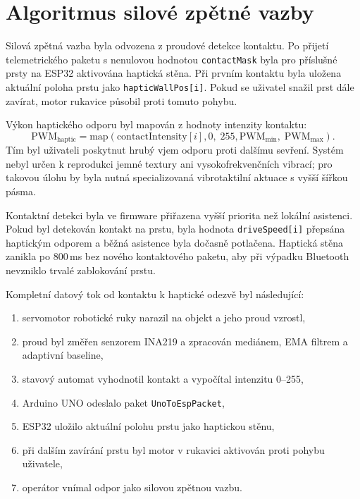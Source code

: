 \section{Algoritmus silové zpětné vazby}
\label{sec:algoritmus-force-feedback}

Silová zpětná vazba byla odvozena z proudové detekce kontaktu. Po přijetí telemetrického paketu s nenulovou hodnotou \texttt{contactMask} byla pro příslušné prsty na ESP32 aktivována haptická stěna. Při prvním kontaktu byla uložena aktuální poloha prstu jako \texttt{hapticWallPos[i]}. Pokud se uživatel snažil prst dále zavírat, motor rukavice působil proti tomuto pohybu.

Výkon haptického odporu byl mapován z hodnoty intenzity kontaktu:
\begin{equation}
    \mathrm{PWM}_{\mathrm{haptic}} =
    \mathrm{map}\left(
        \mathrm{contactIntensity}[i],
        0,\;255,
        \mathrm{PWM}_{\min},\;\mathrm{PWM}_{\max}
    \right).
\end{equation}
Tím byl uživateli poskytnut hrubý vjem odporu proti dalšímu sevření. Systém nebyl určen k reprodukci jemné textury ani vysokofrekvenčních vibrací; pro takovou úlohu by byla nutná specializovaná vibrotaktilní aktuace s vyšší šířkou pásma.

Kontaktní detekci byla ve firmware přiřazena vyšší priorita než lokální asistenci. Pokud byl detekován kontakt na prstu, byla hodnota \texttt{driveSpeed[i]} přepsána haptickým odporem a běžná asistence byla dočasně potlačena. Haptická stěna zanikla po 800\,ms bez nového kontaktového paketu, aby při výpadku Bluetooth nevzniklo trvalé zablokování prstu.

Kompletní datový tok od kontaktu k haptické odezvě byl následující:

\begin{enumerate}
    \item servomotor robotické ruky narazil na objekt a jeho proud vzrostl,
    \item proud byl změřen senzorem INA219 a zpracován mediánem, EMA filtrem a adaptivní baseline,
    \item stavový automat vyhodnotil kontakt a vypočítal intenzitu 0--255,
    \item Arduino UNO odeslalo paket \texttt{UnoToEspPacket},
    \item ESP32 uložilo aktuální polohu prstu jako haptickou stěnu,
    \item při dalším zavírání prstu byl motor v rukavici aktivován proti pohybu uživatele,
    \item operátor vnímal odpor jako silovou zpětnou vazbu.
\end{enumerate}

